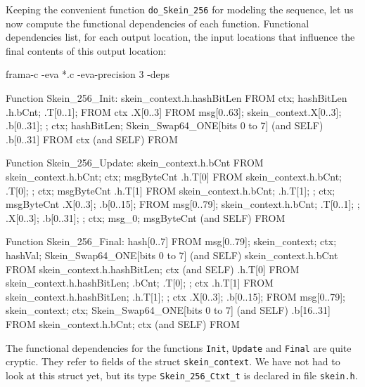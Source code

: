 \documentclass{frama-c-book}
\begin{document}
Keeping the convenient function \lstinline|do_Skein_256| for modeling the
sequence, let us now compute the functional dependencies of each function.
Functional dependencies list, for each output location,
the input locations that influence the final contents of this output location:
\begin{frama-c-commands}
frama-c -eva *.c -eva-precision 3 -deps
\end{frama-c-commands}
\begin{logs}
Function Skein_256_Init:
  skein_context.h.hashBitLen FROM ctx; hashBitLen
               .h{.bCnt; .T[0..1]; } FROM ctx
               .X[0..3] FROM msg[0..63];
                             skein_context{.X[0..3]; .b[0..31]; }; ctx;
                             hashBitLen; Skein_Swap64_ONE[bits 0 to 7] (and SELF)
               .b[0..31] FROM ctx (and SELF)
  \result FROM \nothing

Function Skein_256_Update:
  skein_context.h.bCnt FROM skein_context.h.bCnt; ctx; msgByteCnt
               .h.T[0] FROM skein_context.h{.bCnt; .T[0]; }; ctx; msgByteCnt
               .h.T[1] FROM skein_context{.h.bCnt; .h.T[1]; }; ctx;
                            msgByteCnt
               {.X[0..3]; .b[0..15]; } FROM msg[0..79];
                                            skein_context{.h{.bCnt; .T[0..1]; };
                                                          .X[0..3]; .b[0..31]; };
                                             ctx; msg_0; msgByteCnt (and SELF)
  \result FROM \nothing

Function Skein_256_Final:
  hash[0..7] FROM msg[0..79]; skein_context; ctx;
                  hashVal; Skein_Swap64_ONE[bits 0 to 7] (and SELF)
  skein_context.h.bCnt FROM skein_context.h.hashBitLen; ctx (and SELF)
               .h.T[0] FROM skein_context.h{.hashBitLen; .bCnt; .T[0]; }; ctx
               .h.T[1] FROM skein_context{.h.hashBitLen; .h.T[1]; }; ctx
               {.X[0..3]; .b[0..15]; } FROM msg[0..79]; skein_context; ctx;
                                            Skein_Swap64_ONE[bits 0 to 7]
                                            (and SELF)
               .b[16..31] FROM skein_context.h.bCnt; ctx (and SELF)
  \result FROM \nothing
\end{logs}
The functional dependencies for the functions \lstinline|Init|,
\lstinline|Update| and \lstinline|Final| are quite cryptic. They refer
to fields of the struct \lstinline|skein_context|. We have not had
to look at this struct yet, but its type \lstinline|Skein_256_Ctxt_t|
is declared in file \verb|skein.h|.
\end{document}
